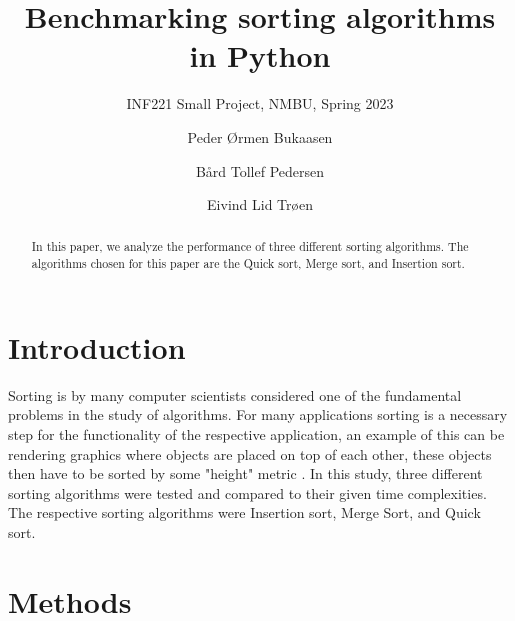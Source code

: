 \documentclass[sigconf, nonacm, natbib, screen, balance=False, 9.5pt]{acmart}
\begin{document}
\title{Benchmarking sorting algorithms in Python}

\subtitle{INF221 Small Project, NMBU, Spring 2023}

\author{Peder Ørmen Bukaasen}
\affiliation{}  %

\author{Bård Tollef Pedersen}
\affiliation{}  %

\author{Eivind Lid Trøen}

\begin{abstract}
 In this paper, we analyze the performance of three different sorting algorithms. The algorithms chosen for this paper are the Quick sort, Merge sort, and Insertion sort.
\end{abstract}


\maketitle

\section{Introduction}\label{sec:intro}

Sorting is by many computer scientists considered one of the fundamental problems in the study of algorithms. For many applications sorting is a necessary step for the functionality of the respective application, an example of this can be rendering graphics where objects are placed on top of each other, these objects then have to be sorted by some "height" metric \cite{CLRS_2009}. In this study, three different sorting algorithms were tested and compared to their given time complexities. The respective sorting algorithms were Insertion sort, Merge Sort, and Quick sort. 

\section{Methods}\label{sec:methods}
\end{document}
